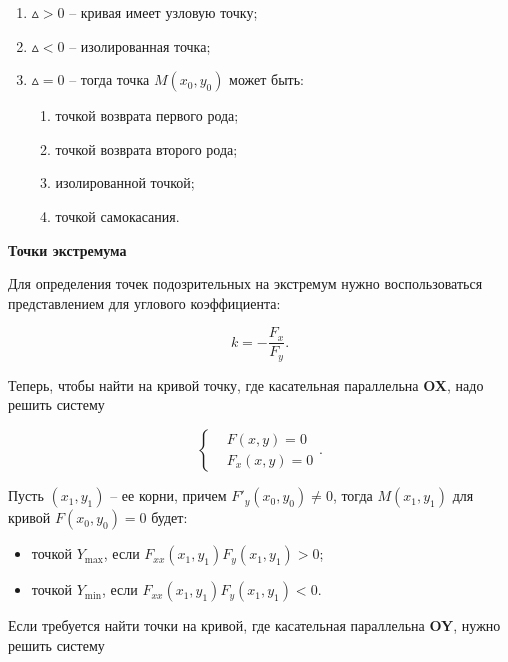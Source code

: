 \begin{enumerate}
	\item $\vartriangle > 0$ -- кривая имеет узловую точку;
	
	\item $\vartriangle < 0$ -- изолированная точка;
	
	\item $\vartriangle = 0$ -- тогда точка $M \left( x_{0}, y_{0} \right)$ может быть:
	
	\begin{enumerate}
		\item точкой возврата первого рода;
		
		\item точкой возврата второго рода;
		
		\item изолированной точкой;
		
		\item точкой самокасания. 
	\end{enumerate}
\end{enumerate}

\textbf{Точки экстремума}

Для определения точек подозрительных на экстремум нужно  воспользоваться представлением для углового коэффициента:

\[
k = - \frac{F_{x}}{F_{y}}.
\]

Теперь, чтобы найти на кривой точку, где касательная параллельна \textbf{OX}, надо решить систему

\[
\begin{cases}
& F \left( x, y \right) = 0\\
& F_{x} \left( x, y \right) = 0
\end{cases}.
\]

Пусть $\left( x_{1}, y_{1} \right)$ -- ее корни, причем $F'_{y} \left( x_{0}, y_{0} \right) \neq 0$, тогда $M \left( x_{1}, y_{1} \right)$ для кривой $F \left( x_{0}, y_{0} \right) = 0$ будет:

\begin{itemize}
	\item точкой $Y_{\max}$, если $F_{xx} \left( x_{1}, y_{1} \right) F_{y} \left( x_{1}, y_{1} \right) > 0$;
	
	\item точкой $Y_{\min}$, если $F_{xx} \left( x_{1}, y_{1} \right) F_{y} \left( x_{1}, y_{1} \right) < 0$.
\end{itemize}

Если требуется найти точки на кривой, где касательная параллельна \textbf{OY}, нужно решить систему

